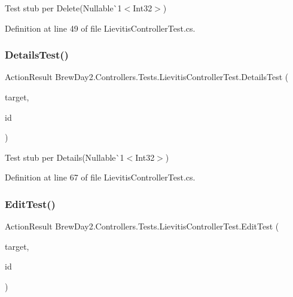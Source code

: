 Test stub per Delete(Nullable\`{}1$<$Int32$>$)



Definition at line 49 of file Lievitis\+Controller\+Test.\+cs.

\mbox{\label{class_brew_day2_1_1_controllers_1_1_tests_1_1_lievitis_controller_test_a0981b1ca63e1c7cef09eafefcf1d24c4}} 
\subsubsection{\texorpdfstring{Details\+Test()}{DetailsTest()}}
{\footnotesize\ttfamily Action\+Result Brew\+Day2.\+Controllers.\+Tests.\+Lievitis\+Controller\+Test.\+Details\+Test (\begin{DoxyParamCaption}\item[{\mbox{[}\+Pex\+Assume\+Under\+Test\mbox{]} \mbox{\hyperlink{class_brew_day2_1_1_controllers_1_1_lievitis_controller}{Lievitis\+Controller}}}]{target,  }\item[{int?}]{id }\end{DoxyParamCaption})}



Test stub per Details(Nullable\`{}1$<$Int32$>$)



Definition at line 67 of file Lievitis\+Controller\+Test.\+cs.

\mbox{\label{class_brew_day2_1_1_controllers_1_1_tests_1_1_lievitis_controller_test_a136d9506ffdff4f40c67c76bb68d1aa7}} 
\subsubsection{\texorpdfstring{Edit\+Test()}{EditTest()}}
{\footnotesize\ttfamily Action\+Result Brew\+Day2.\+Controllers.\+Tests.\+Lievitis\+Controller\+Test.\+Edit\+Test (\begin{DoxyParamCaption}\item[{\mbox{[}\+Pex\+Assume\+Under\+Test\mbox{]} \mbox{\hyperlink{class_brew_day2_1_1_controllers_1_1_lievitis_controller}{Lievitis\+Controller}}}]{target,  }\item[{int?}]{id }\end{DoxyParamCaption})}




